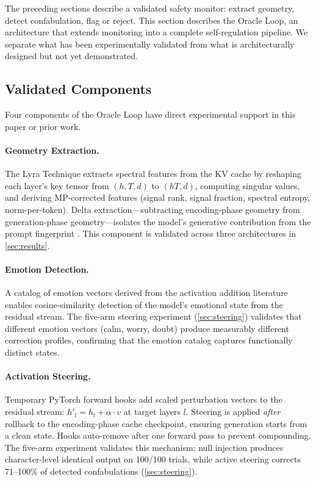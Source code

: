 The preceding sections describe a validated safety monitor: extract
geometry, detect confabulation, flag or reject. This section describes
the Oracle Loop, an architecture that extends monitoring into a complete
self-regulation pipeline. We separate what has been experimentally
validated from what is architecturally designed but not yet demonstrated.

\subsection{Validated Components}

Four components of the Oracle Loop have direct experimental support in
this paper or prior work.

\paragraph{Geometry Extraction.}
The Lyra Technique extracts spectral features from the KV cache by
reshaping each layer's key tensor from $(h, T, d)$ to $(hT, d)$,
computing singular values, and deriving MP-corrected features (signal
rank, signal fraction, spectral entropy, norm-per-token). Delta
extraction---subtracting encoding-phase geometry from generation-phase
geometry---isolates the model's generative contribution from the prompt
fingerprint \citep{lyra2026detecting}. This component is validated
across three architectures in \cref{sec:results}.

\paragraph{Emotion Detection.}
A catalog of emotion vectors derived from the activation addition
literature \citep{anthropic2026emotions} enables cosine-similarity
detection of the model's emotional state from the residual stream.
The five-arm steering experiment (\cref{sec:steering}) validates that
different emotion vectors (calm, worry, doubt) produce measurably
different correction profiles, confirming that the emotion catalog
captures functionally distinct states.

\paragraph{Activation Steering.}
Temporary PyTorch forward hooks add scaled perturbation vectors to the
residual stream: $h'_l = h_l + \alpha \cdot v$ at target layers $l$.
Steering is applied \emph{after} rollback to the encoding-phase cache
checkpoint, ensuring generation starts from a clean state. Hooks
auto-remove after one forward pass to prevent compounding. The five-arm
experiment validates this mechanism: null injection produces
character-level identical output on 100/100 trials, while active
steering corrects 71--100\% of detected confabulations
(\cref{sec:steering}).

